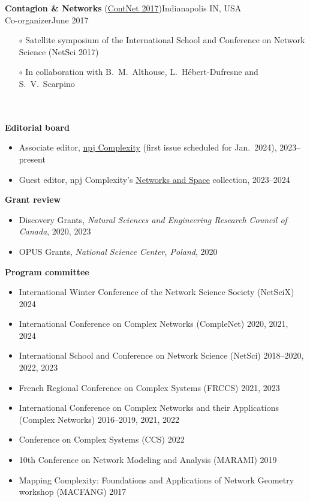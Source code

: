 \documentclass[11pt]{article}
\newcommand{\TitreSection}[1]{\colorbox{background}{\makebox[\textwidth-0.5em][c]{\Large\textrm{\textsc{#1}}}}\vspace{0.75\baselineskip}\\}
\begin{document}
%
\parbox{\textwidth}{%
\textbf{Contagion \& Networks} (\href{http://networkscontagion.github.io/contnet2017/}{ContNet 2017})\hfill Indianapolis IN, USA\\
Co-organizer\hfill June 2017
\begin{itemize}[leftmargin=1.5em]\small
  \item[$\circ$] Satellite symposium of the International School and Conference on Network Science (NetSci 2017)
  \item[$\circ$] In collaboration with B.~M.~Althouse, L.~H\'ebert-Dufresne and S.~V.~Scarpino
\end{itemize}} \vspace{0.75\baselineskip} \\
%
%
%
%
%
\TitreSection{Reviewing Activities}
%
\textbf{Editorial board}
%
\begin{itemize}\small
  \item Associate editor, \href{https://www.nature.com/npjcomplex}{npj Complexity} (first issue scheduled for Jan.~2024), 2023--present
  \item Guest editor, npj Complexity's \href{https://www.nature.com/collections/jbahhgfhii}{Networks and Space} collection, 2023--2024
\end{itemize}
%
%
%
\textbf{Grant review}
%
\begin{itemize}\small
  \item Discovery Grants, \textit{Natural Sciences and Engineering Research Council of Canada}, 2020, 2023
  \item OPUS Grants, \textit{National Science Center, Poland}, 2020
\end{itemize}
%
%
%
\textbf{Program committee}
%
\begin{itemize}\small
  \item International Winter Conference of the Network Science Society (NetSciX) 2024
  \item International Conference on Complex Networks (CompleNet) 2020, 2021, 2024
  \item International School and Conference on Network Science (NetSci) 2018--2020, 2022, 2023
  \item French Regional Conference on Complex Systems (FRCCS) 2021, 2023
  \item International Conference on Complex Networks and their Applications (Complex Networks) 2016--2019, 2021, 2022
  \item Conference on Complex Systems (CCS) 2022
  \item 10th Conference on Network Modeling and Analysis (MARAMI) 2019
  \item Mapping Complexity: Foundations and Applications of Network Geometry workshop (MACFANG) 2017
\end{itemize}
\end{document}

